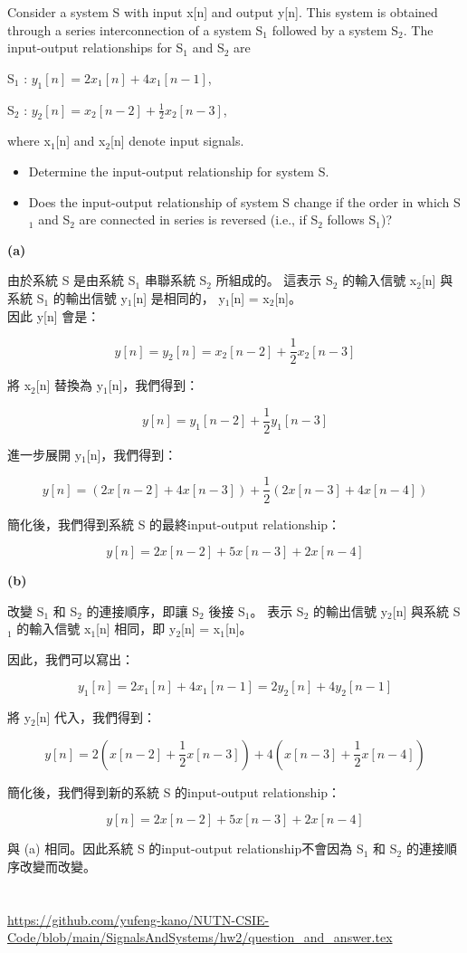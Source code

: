 \documentclass[12pt,a4paper]{article}
\begin{document}
\parbox[t]{\dimexpr\linewidth-\question}{
  Consider a system S with input x[n] and output y[n]. This system is obtained through a series interconnection of a system S\(_1\) followed by a system S\(_2\). The input-output relationships for S\(_1\) and S\(_2\) are

  S\(_1\) : \(y_1[n] = 2x_1[n] + 4x_1[n - 1]\),
  
  S\(_2\) : \(y_2[n] = x_2[n - 2] + \frac{1}{2}x_2[n - 3]\),
  
  where x\(_1\)[n] and x\(_2\)[n] denote input signals.
  \noindent \begin{itemize}
    \item[(a)] Determine the input-output relationship for system S.
    \item[(b)] Does the input-output relationship of system S change if the order in which S\(_1\) and S\(_2\) are connected in series is reversed (i.e., if S\(_2\) follows S\(_1\))?
  \end{itemize}
}


{\bf (a)} 
\parbox[t]{\dimexpr\linewidth-\question} {
由於系統 S 是由系統 S\(_1\) 串聯系統 S\(_2\) 所組成的。
這表示 S\(_2\) 的輸入信號 x\(_2\)[n]  
與系統 S\(_1\) 的輸出信號 y\(_1\)[n] 是相同的， y\(_1\)[n] = x\(_2\)[n]。
\\因此 y[n] 會是：

\[
y[n] = y_2[n] = x_2[n - 2] + \frac{1}{2}x_2[n - 3]
\]

將 x\(_2\)[n] 替換為 y\(_1\)[n]，我們得到：

\[
y[n] = y_1[n - 2] + \frac{1}{2}y_1[n - 3]
\]

進一步展開 y\(_1\)[n]，我們得到：

\[
y[n] = (2x[n - 2] + 4x[n - 3]) + \frac{1}{2}(2x[n - 3] + 4x[n - 4])
\]

簡化後，我們得到系統 S 的最終input-output relationship：

\[
y[n] = 2x[n - 2] + 5x[n - 3] + 2x[n - 4]
\]
}

{\bf (b)} 
\parbox[t]{\dimexpr\linewidth-\question} {
改變 S\(_1\) 和 S\(_2\) 的連接順序，即讓 S\(_2\) 後接 S\(_1\)。
表示 S\(_2\) 的輸出信號 y\(_2\)[n] 
與系統 S\(_1\) 的輸入信號 x\(_1\)[n] 相同，即 y\(_2\)[n] = x\(_1\)[n]。

因此，我們可以寫出：

\[
y_1[n] = 2x_1[n] + 4x_1[n - 1] = 2y_2[n] + 4y_2[n - 1]
\]

將 y\(_2\)[n] 代入，我們得到：

\[
y[n] = 2(x[n - 2] + \frac{1}{2}x[n - 3]) + 4(x[n - 3] + \frac{1}{2}x[n - 4])
\]

簡化後，我們得到新的系統 S 的input-output relationship：

\[
y[n] = 2x[n - 2] + 5x[n - 3] + 2x[n - 4]
\]

與 (a) 相同。因此系統 S 的input-output relationship不會因為 S\(_1\) 和 S\(_2\) 的連接順序改變而改變。
}



\section*{\heiti \color{black}{SourceCode}}
\sloppy
\noindent \url{https://github.com/yufeng-kano/NUTN-CSIE-Code/blob/main/SignalsAndSystems/hw2/question_and_answer.tex}
\end{document}
